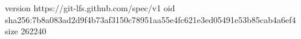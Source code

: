 version https://git-lfs.github.com/spec/v1
oid sha256:7b8a083ad2d9f4b73af3150c78951aa55e4fc621e3ed05491e53b85cab4a6ef4
size 262240
